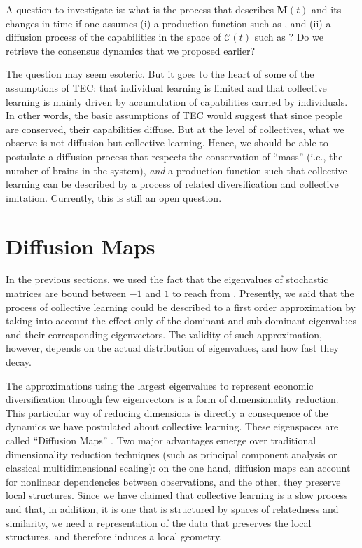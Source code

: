 \documentclass[12pt]{article}
\newcommand{\mtx}[1]{\mathbf{ #1}}
\begin{document}
A question to investigate is: what is the process that describes $\mtx{M}(t)$ and its changes in time if one assumes (i) a production function such as , and (ii) a diffusion process of the capabilities in the space of $\mtx{{\mathcal C}}(t)$ such as ? Do we retrieve the consensus dynamics that we proposed earlier?

The question may seem esoteric. But it goes to the heart of some of the assumptions of TEC: that individual learning is limited and that collective learning is mainly driven by accumulation of capabilities carried by individuals. In other words, the basic assumptions of TEC would suggest that since people are conserved, their capabilities diffuse. But at the level of collectives, what we observe is not diffusion but collective learning. Hence, we should be able to postulate a diffusion process that respects the conservation of ``mass'' (i.e., the number of brains in the system), \emph{and} a production function such that collective learning can be described by a process of related diversification and collective imitation. Currently, this is still an open question.



\section{Diffusion Maps}
In the previous sections, we used the fact that the eigenvalues of stochastic matrices are bound between $-1$ and $1$ to reach  from . Presently, we said that the process of collective learning could be described to a first order approximation by taking into account the effect only of the dominant and sub-dominant eigenvalues and their corresponding eigenvectors. The validity of such approximation, however, depends on the actual distribution of eigenvalues, and how fast they decay.

The approximations using the largest eigenvalues to represent economic diversification through few eigenvectors is a form of dimensionality reduction. This particular way of reducing dimensions is directly a consequence of the dynamics we have postulated about collective learning. These eigenspaces are called ``Diffusion Maps'' \citep{lafon_diffusion_2006,coifman_diffusion_2006}. Two major advantages emerge over traditional dimensionality reduction techniques (such as principal component analysis or classical multidimensional scaling): on the one hand, diffusion maps can account for nonlinear dependencies between observations, and the other, they preserve local structures. Since we have claimed that collective learning is a slow process and that, in addition, it is one that is structured by spaces of relatedness and similarity, we need a representation of the data that preserves the local structures, and therefore induces a local geometry. 
\end{document}
